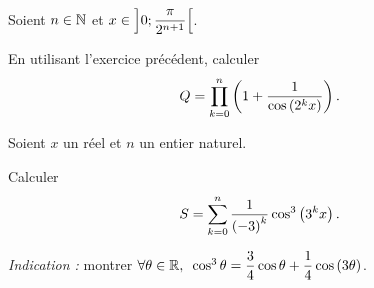 \begin{exo}
Soient \(n\in\mathbb{N}\) et \(x\in\left]0;\dfrac{\pi}{2^{n+1}}\right[\).

En utilisant l'exercice précédent, calculer \[Q=\prod_{k=0}^{n}\left(1+\dfrac{1}{\cos\left(2^kx\right)}\right).\]
\end{exo}

\begin{corr}
\end{corr}

\begin{exo}
Soient \(x\) un réel et \(n\) un entier naturel.

Calculer \[S=\sum_{k=0}^{n}\dfrac{1}{\left(-3\right)^k}\cos^3\left(3^kx\right).\]

\textit{Indication :} montrer \(\quantifs{\forall\theta\in\R}\cos^3\theta=\dfrac{3}{4}\cos\theta+\dfrac{1}{4}\cos\paren{3\theta}\).
\end{exo}

\begin{corr}
\end{corr}